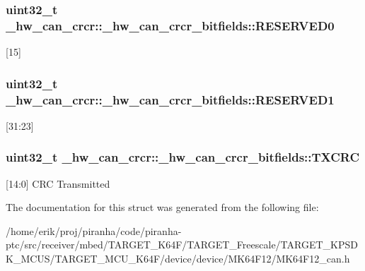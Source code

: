 \subsubsection[{\texorpdfstring{R\+E\+S\+E\+R\+V\+E\+D0}{RESERVED0}}]{\setlength{\rightskip}{0pt plus 5cm}uint32\+\_\+t \+\_\+hw\+\_\+can\+\_\+crcr\+::\+\_\+hw\+\_\+can\+\_\+crcr\+\_\+bitfields\+::\+R\+E\+S\+E\+R\+V\+E\+D0}\hypertarget{struct__hw__can__crcr_1_1__hw__can__crcr__bitfields_a9a327a8fca2ca46365c1ee8912e015b1}{}\label{struct__hw__can__crcr_1_1__hw__can__crcr__bitfields_a9a327a8fca2ca46365c1ee8912e015b1}
\mbox{[}15\mbox{]} 
\subsubsection[{\texorpdfstring{R\+E\+S\+E\+R\+V\+E\+D1}{RESERVED1}}]{\setlength{\rightskip}{0pt plus 5cm}uint32\+\_\+t \+\_\+hw\+\_\+can\+\_\+crcr\+::\+\_\+hw\+\_\+can\+\_\+crcr\+\_\+bitfields\+::\+R\+E\+S\+E\+R\+V\+E\+D1}\hypertarget{struct__hw__can__crcr_1_1__hw__can__crcr__bitfields_aac01c4a32eff6b4413693fd0fd6580be}{}\label{struct__hw__can__crcr_1_1__hw__can__crcr__bitfields_aac01c4a32eff6b4413693fd0fd6580be}
\mbox{[}31\+:23\mbox{]} 
\subsubsection[{\texorpdfstring{T\+X\+C\+RC}{TXCRC}}]{\setlength{\rightskip}{0pt plus 5cm}uint32\+\_\+t \+\_\+hw\+\_\+can\+\_\+crcr\+::\+\_\+hw\+\_\+can\+\_\+crcr\+\_\+bitfields\+::\+T\+X\+C\+RC}\hypertarget{struct__hw__can__crcr_1_1__hw__can__crcr__bitfields_a352d6e51531b5556145851a5b8ace882}{}\label{struct__hw__can__crcr_1_1__hw__can__crcr__bitfields_a352d6e51531b5556145851a5b8ace882}
\mbox{[}14\+:0\mbox{]} C\+RC Transmitted 

The documentation for this struct was generated from the following file\+:\begin{DoxyCompactItemize}
\item 
/home/erik/proj/piranha/code/piranha-\/ptc/src/receiver/mbed/\+T\+A\+R\+G\+E\+T\+\_\+\+K64\+F/\+T\+A\+R\+G\+E\+T\+\_\+\+Freescale/\+T\+A\+R\+G\+E\+T\+\_\+\+K\+P\+S\+D\+K\+\_\+\+M\+C\+U\+S/\+T\+A\+R\+G\+E\+T\+\_\+\+M\+C\+U\+\_\+\+K64\+F/device/device/\+M\+K64\+F12/M\+K64\+F12\+\_\+can.\+h\end{DoxyCompactItemize}

